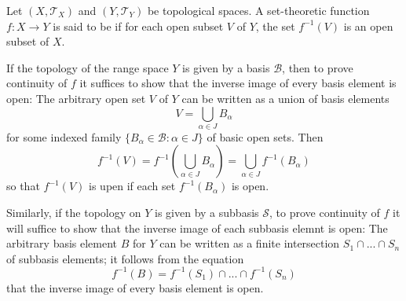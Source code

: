 \documentclass[12pt, a4paper, oneside, openright, titlepage]{book}
\begin{document}
\begin{defn}
    Let $(X,\mathcal{T}_X)$ and $(Y,\mathcal{T}_Y)$ be topological spaces. A set-theoretic function $f:X\rightarrow Y$ is said to be  if for each open subset $V$ of $Y$, the set $f^{-1}(V)$ is an open subset of $X$.
\end{defn}


\begin{rmk}
    If the topology of the range space $Y$ is given by a basis $\mathcal{B}$, then to prove continuity of $f$ it suffices to show that the inverse image of every basis element is open: The arbitrary open set $V$ of $Y$ can be written as a union of basis elements \begin{equation*}
        V = \bigcup_{\alpha \in J}B_{\alpha}
    \end{equation*}
    for some indexed family $\{B_{\alpha} \in\mathcal{B}: \alpha \in J\}$ of basic open sets. Then \begin{equation*}
        f^{-1}(V) = f^{-1}\left(\bigcup_{\alpha \in J}B_{\alpha}\right) = \bigcup_{\alpha \in J}f^{-1}(B_{\alpha})
    \end{equation*}
    so that $f^{-1}(V)$ is upen if each set $f^{-1}(B_{\alpha})$ is open. 

    Similarly, if the topology on $Y$ is given by a subbasis $\mathcal{S}$, to prove continuity of $f$ it will suffice to show that the inverse image of each subbasis elemnt is open: The arbitrary basis element $B$ for $Y$ can be written as a finite intersection $S_1\cap...\cap S_n$ of subbasis elements; it follows from the equation \begin{equation*}
        f^{-1}(B) = f^{-1}(S_1)\cap...\cap f^{-1}(S_n)
    \end{equation*}
    that the inverse image of every basis element is open.
\end{rmk}
\end{document}

